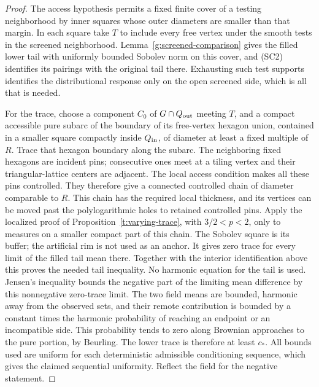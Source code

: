 \begin{proof}
The access hypothesis permits a fixed finite cover of a testing
neighborhood by inner squares whose outer diameters are smaller than
that margin. In each square take $T$ to include every free vertex under
the smooth tests in the screened neighborhood. Lemma~\ref{g:screened-comparison}
gives the filled lower tail with uniformly bounded Sobolev norm on this
cover, and (SC2) identifies its pairings with the original tail there.
Exhausting such test supports identifies the distributional response
only on the open screened side, which is all that is needed.

For the trace, choose a component $C_0$ of $G\cap Q_{\rm out}$ meeting
$T$, and a compact accessible pure subarc of the boundary of its
free-vertex hexagon union, contained in a smaller square compactly
inside $Q_{\rm in}$, of diameter at least a fixed multiple of $R$.
Trace that hexagon boundary along the subarc. The neighboring
fixed hexagons are incident pins; consecutive ones meet at a tiling
vertex and their triangular-lattice centers are adjacent. The local
access condition makes all these pins controlled. They therefore give
a connected controlled chain of diameter comparable to $R$. This chain
has the required local thickness, and its vertices can be moved past
the polylogarithmic holes to retained controlled pins. Apply the
localized proof of Proposition~\ref{t:varying-trace}, with $3/2<p<2$,
only to measures on a smaller compact part of this chain. The Sobolev
square is its buffer; the artificial rim is not used as an anchor.
It gives zero trace for every limit of the filled tail mean there.
Together with the interior identification above this proves the needed
tail inequality. No harmonic equation for the tail is used.
Jensen's inequality bounds the negative part of the limiting mean
difference by this nonnegative zero-trace limit. The two field means are
bounded, harmonic away from the observed sets, and their remote
contribution is bounded by a constant times the harmonic probability of
reaching an endpoint or an incompatible side. This probability tends to
zero along Brownian approaches to the pure portion, by Beurling.
The lower trace is therefore at least \(c_*\). All bounds used are
uniform for each deterministic admissible conditioning sequence, which
gives the claimed sequential uniformity. Reflect the field for the
negative statement.


\end{proof}
